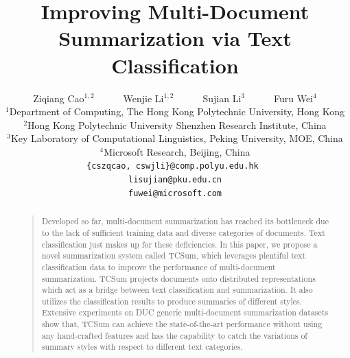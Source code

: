 \documentclass[letterpaper]{article}
\begin{document}
\title{Improving Multi-Document Summarization via Text Classification }
\author{
Ziqiang Cao$^{1,2}$ ~~ ~~ Wenjie Li$^{1,2}$ ~~ ~~ Sujian Li$^3$ ~~ ~~ Furu Wei$^4$\\
$^1$Department of Computing, The Hong Kong Polytechnic University, Hong Kong\\
$^2$Hong Kong Polytechnic University Shenzhen Research Institute, China\\
$^3$Key Laboratory of Computational Linguistics, Peking University, MOE, China \\
$^4$Microsoft Research, Beijing, China\\
{\tt \{cszqcao, cswjli\}@comp.polyu.edu.hk  } \\
{\tt lisujian@pku.edu.cn} \\
{\tt fuwei@microsoft.com} \\
}
\maketitle
\begin{abstract}
	\begin{quote}
		Developed so far, multi-document summarization has reached its bottleneck due to the lack of sufficient training data and diverse categories of documents.
		Text classification just makes up for these deficiencies.
		In this paper, we propose a novel summarization system called TCSum, which leverages plentiful text classification data to improve the performance of multi-document summarization.
		TCSum projects documents onto distributed representations which act as a bridge between text classification and summarization.
		It also utilizes the classification results to produce summaries of different styles.
		Extensive experiments on DUC generic multi-document summarization datasets show that, TCSum can achieve the state-of-the-art performance without using any hand-crafted features and has the capability to catch the variations of summary styles with respect to different text categories.
	\end{quote}
\end{abstract}
\end{document}
